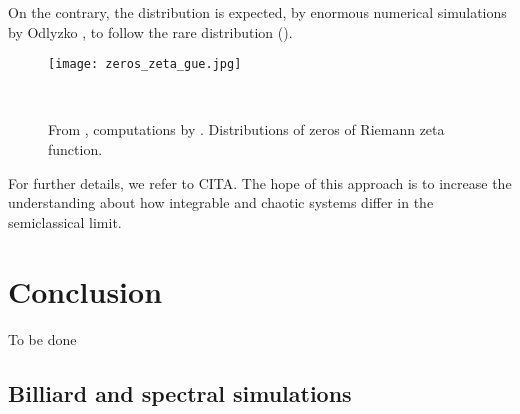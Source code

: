 On the contrary, the distribution is expected, by enormous numerical simulations by Odlyzko \cite{Odly:comput}, to follow the rare \GUE distribution (\cite{Rudnick:whatIs}).


\begin{figure}[H]
\centering

    \texttt{[image: zeros\_zeta\_gue.jpg]}

  \noindent\\

  \decoRule
  \caption{From \cite{Rudnick:whatIs}, computations by \cite{Odly:comput}. Distributions of zeros of Riemann zeta function.}
  \label{fig:gue_distrib_zeta}
\end{figure}



For further details, we refer to CITA. The hope of this approach is to increase the understanding about how integrable and chaotic systems differ in the semiclassical limit.













\section{Conclusion}

To be done




\subsection{Billiard and spectral simulations}



